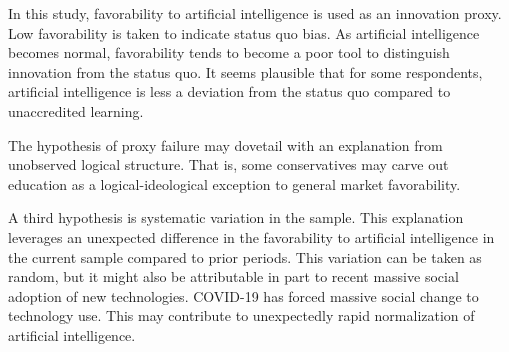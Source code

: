 \documentclass[review]{elsarticle}
\begin{document}
In this study, favorability to artificial intelligence is used as an innovation proxy.
Low favorability is taken to indicate status quo bias.
As artificial intelligence becomes normal,
favorability tends to become a poor tool to distinguish innovation from the status quo.
It seems plausible that for some respondents,
artificial intelligence is less a deviation from the status quo
compared to unaccredited learning.

The hypothesis of proxy failure may dovetail with an explanation from unobserved logical structure.
That is, some conservatives may carve out education as a logical-ideological exception to general market favorability.

A third hypothesis is systematic variation in the sample.
This explanation leverages an unexpected difference in the favorability to artificial intelligence
in the current sample compared to prior periods.
This variation can be taken as random,
but it might also be attributable in part to recent massive social adoption of new technologies.
COVID-19 has forced massive social change to technology use.
This may contribute to unexpectedly rapid normalization of artificial intelligence.






\end{document}
